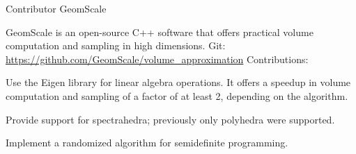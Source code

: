 

\begin{cventries}



  \cventry
    {Contributor} %
    {GeomScale} %
    {} %
    {} %
    {
    	GeomScale is an open-source C++ software that offers practical volume computation and sampling in high dimensions.
    	\newline
    	Git: \url{https://github.com/GeomScale/volume_approximation}
    	\newline
    	\medskip
    	Contributions:
    	\bigskip
      \begin{cvitems} %
		\item {Use the Eigen library for linear algebra operations. It offers a speedup in volume computation 
				and sampling of a factor of at least 2, depending on the algorithm}.
        \item {Provide support for spectrahedra; previously only polyhedra were supported.}
        \item {Implement a randomized algorithm for semidefinite programming.}
      \end{cvitems}
    }


\end{cventries}
